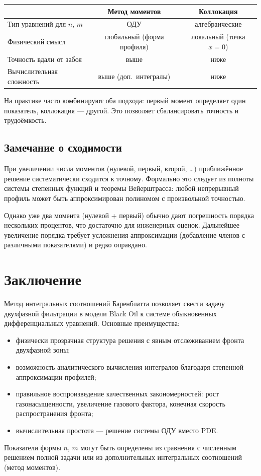 \documentclass[12pt,a4paper]{article}
\begin{document}
\begin{center}
\begin{tabular}{lcc}
  \hline
  & \textbf{Метод моментов} & \textbf{Коллокация} \\
  \hline
  Тип уравнений для $n$, $m$ & ОДУ & алгебраические \\
  Физический смысл & глобальный (форма профиля) & локальный (точка $x=0$) \\
  Точность вдали от забоя & выше & ниже \\
  Вычислительная сложность & выше (доп.\ интегралы) & ниже \\
  \hline
\end{tabular}
\end{center}

На практике часто комбинируют оба подхода: первый момент определяет
один показатель, коллокация --- другой. Это позволяет сбалансировать
точность и трудоёмкость.

\subsection{Замечание о сходимости}

При увеличении числа моментов (нулевой, первый, второй, \ldots)
приближённое решение систематически сходится к точному. Формально
это следует из полноты системы степенных функций и теоремы Вейерштрасса:
любой непрерывный профиль может быть аппроксимирован полиномом
с произвольной точностью.

Однако уже два момента (нулевой + первый) обычно дают погрешность
порядка нескольких процентов, что достаточно для инженерных оценок.
Дальнейшее увеличение порядка требует усложнения аппроксимации
(добавление членов с различными показателями) и редко оправдано.

\section{Заключение}

Метод интегральных соотношений Баренблатта позволяет свести задачу
двухфазной фильтрации в модели Black Oil к системе обыкновенных
дифференциальных уравнений. Основные преимущества:
\begin{itemize}
  \item физически прозрачная структура решения с явным отслеживанием
        фронта двухфазной зоны;
  \item возможность аналитического вычисления интегралов благодаря
        степенной аппроксимации профилей;
  \item правильное воспроизведение качественных закономерностей:
        рост газонасыщенности, увеличение газового фактора,
        конечная скорость распространения фронта;
  \item вычислительная простота --- решение системы ОДУ вместо PDE.
\end{itemize}

Показатели формы $n$, $m$ могут быть определены из сравнения
с численным решением полной задачи или из дополнительных
интегральных соотношений (метод моментов).
\end{document}
